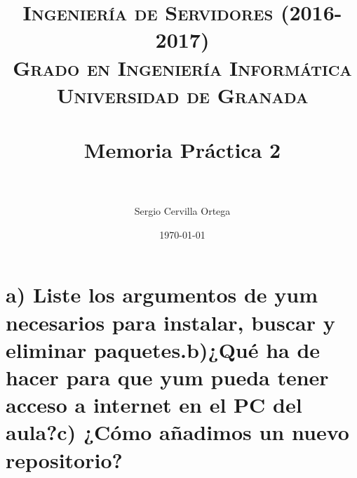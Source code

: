 

\usepackage[sfdefault]{roboto}
\usepackage{sectsty}
\usepackage{hyperref}
\usepackage{listings}

\sectionfont{\fontsize{12}{15}\selectfont}
\title{
\normalfont \normalsize
\textsc{\textbf{Ingeniería de Servidores (2016-2017)} \\ Grado en Ingeniería Informática \\ Universidad de Granada} \\ [25pt] %
\horrule{0.5pt} \\[0.4cm] %
\huge Memoria Práctica 2 \\ %
\horrule{2pt} \\[0.5cm] %
}

\author{Sergio Cervilla Ortega} %

\date{\normalsize\today} %




\maketitle %

\newpage %

\tableofcontents %

\listoffigures


\newpage


\section{a) Liste los argumentos de yum necesarios para instalar, buscar y eliminar paquetes.\newline b)¿Qué ha de hacer para que yum pueda tener acceso a internet en el PC del aula?\newline c) ¿Cómo añadimos un nuevo repositorio?}

